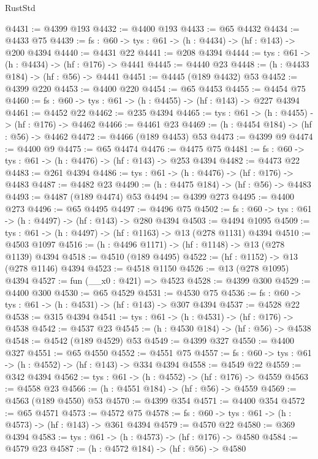 \begin{lexlean}{RustStd}
\begin{coremodule}
@4431 := @4399 @193
@4432 := @4400 @193
@4433 := @65 @4432
@4434 := @4433 @75
@4439 := {fs : @60} -> {tys : @61} -> (h : @4434) -> (hf : @143) -> @200 @4394
@4440 := @4431 @22
@4441 := @208 @4394
@4444 := {tys : @61} -> (h : @4434) -> (hf : @176) -> @4441
@4445 := @4440 @23
@4448 := (h : @4433 @184) -> (hf : @56) -> @4441
@4451 := @4445 (@189 @4432) @53
@4452 := @4399 @220
@4453 := @4400 @220
@4454 := @65 @4453
@4455 := @4454 @75
@4460 := {fs : @60} -> {tys : @61} -> (h : @4455) -> (hf : @143) -> @227 @4394
@4461 := @4452 @22
@4462 := @235 @4394
@4465 := {tys : @61} -> (h : @4455) -> (hf : @176) -> @4462
@4466 := @4461 @23
@4469 := (h : @4454 @184) -> (hf : @56) -> @4462
@4472 := @4466 (@189 @4453) @53
@4473 := @4399 @9
@4474 := @4400 @9
@4475 := @65 @4474
@4476 := @4475 @75
@4481 := {fs : @60} -> {tys : @61} -> (h : @4476) -> (hf : @143) -> @253 @4394
@4482 := @4473 @22
@4483 := @261 @4394
@4486 := {tys : @61} -> (h : @4476) -> (hf : @176) -> @4483
@4487 := @4482 @23
@4490 := (h : @4475 @184) -> (hf : @56) -> @4483
@4493 := @4487 (@189 @4474) @53
@4494 := @4399 @273
@4495 := @4400 @273
@4496 := @65 @4495
@4497 := @4496 @75
@4502 := {fs : @60} -> {tys : @61} -> (h : @4497) -> (hf : @143) -> @280 @4394
@4503 := @4494 @1095
@4509 := {tys : @61} -> (h : @4497) -> (hf : @1163) -> @13 (@278 @1131) @4394
@4510 := @4503 @1097
@4516 := (h : @4496 @1171) -> (hf : @1148) -> @13 (@278 @1139) @4394
@4518 := @4510 (@189 @4495)
@4522 := (hf : @1152) -> @13 (@278 @1146) @4394
@4523 := @4518 @1150
@4526 := @13 (@278 @1095) @4394
@4527 := fun (__x0 : @421) => @4523
@4528 := @4399 @300
@4529 := @4400 @300
@4530 := @65 @4529
@4531 := @4530 @75
@4536 := {fs : @60} -> {tys : @61} -> (h : @4531) -> (hf : @143) -> @307 @4394
@4537 := @4528 @22
@4538 := @315 @4394
@4541 := {tys : @61} -> (h : @4531) -> (hf : @176) -> @4538
@4542 := @4537 @23
@4545 := (h : @4530 @184) -> (hf : @56) -> @4538
@4548 := @4542 (@189 @4529) @53
@4549 := @4399 @327
@4550 := @4400 @327
@4551 := @65 @4550
@4552 := @4551 @75
@4557 := {fs : @60} -> {tys : @61} -> (h : @4552) -> (hf : @143) -> @334 @4394
@4558 := @4549 @22
@4559 := @342 @4394
@4562 := {tys : @61} -> (h : @4552) -> (hf : @176) -> @4559
@4563 := @4558 @23
@4566 := (h : @4551 @184) -> (hf : @56) -> @4559
@4569 := @4563 (@189 @4550) @53
@4570 := @4399 @354
@4571 := @4400 @354
@4572 := @65 @4571
@4573 := @4572 @75
@4578 := {fs : @60} -> {tys : @61} -> (h : @4573) -> (hf : @143) -> @361 @4394
@4579 := @4570 @22
@4580 := @369 @4394
@4583 := {tys : @61} -> (h : @4573) -> (hf : @176) -> @4580
@4584 := @4579 @23
@4587 := (h : @4572 @184) -> (hf : @56) -> @4580

\end{coremodule}
\end{lexlean}

